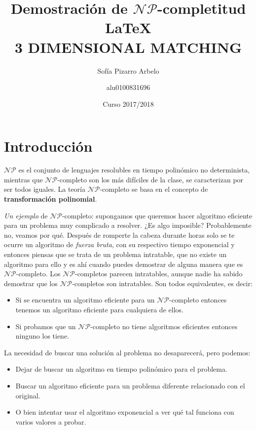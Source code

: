 \documentclass[a4paper,10pt]{article}
\title{\Huge Demostración de $\mathcal{NP}$-completitud \LaTeX \\3 DIMENSIONAL MATCHING}
\author{Sofía Pizarro Arbelo \and alu0100831696}
\date{Curso 2017/2018}
\begin{document}
\maketitle 
\tableofcontents

\section{Introducción}

	$\mathcal{NP}$ es el conjunto de lenguajes resolubles en tiempo polinómico no determinista, mientras que $\mathcal{NP}$-completo son los más difíciles de la clase, se caracterizan por ser todos iguales. La teoría $\mathcal{NP}$-completo se basa en el concepto de \textbf{transformación polinomial}. 

\textit{Un ejemplo} de $\mathcal{NP}$-completo: supongamos que queremos hacer algoritmo eficiente para un problema muy complicado a resolver. ¿Es algo imposible? Probablemente no, veamos por qué. Después de romperte la cabeza durante horas solo se te ocurre un algoritmo de \textit{fuerza bruta}, con su respectivo tiempo exponencial y entonces piensas que se trata de un problema intratable, que no existe un algoritmo para ello y es ahí cuando puedes demostrar de alguna manera que es $\mathcal{NP}$-completo. 
Los $\mathcal{NP}$-completos parecen intratables, aunque nadie ha sabido demostrar que los $\mathcal{NP}$-completos son intratables.
Son todos equivalentes, es decir: 
	\begin{itemize}
		\item Si se encuentra un algoritmo eficiente para un $\mathcal{NP}$-completo entonces tenemos un algoritmo eficiente para cualquiera de ellos.
		\item Si probamos que un $\mathcal{NP}$-completo no tiene algoritmos eficientes entonces ninguno los tiene.
	\end{itemize}

La necesidad de buscar una solución al problema no desaparecerá, pero podemos:

	\begin{itemize}
		\item Dejar de buscar un algoritmo en tiempo polinómico para el problema. 
		\item Buscar un algoritmo eficiente para un problema diferente relacionado con el original.
		\item O bien intentar usar el algoritmo exponencial a ver qué tal funciona con varios valores a probar.
	\end{itemize}
\end{document}
